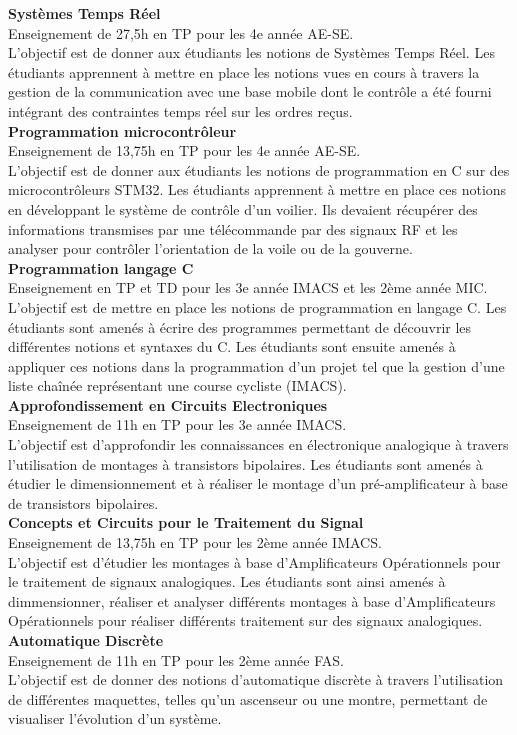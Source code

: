 \documentclass[11pt,a4paper,sans]{moderncv}         %
\begin{document}
{
  \textbf{Syst\`emes Temps R\'eel}\\
  Enseignement de 27,5h en TP pour les 4e ann\'ee AE-SE.\\
  L'objectif est de donner aux \'etudiants les notions de Syst\`emes Temps R\'eel.
  Les \'etudiants apprennent \`a mettre en place les notions vues en cours \`a travers la gestion de la communication avec une base mobile dont le contr\^ole a \'et\'e fourni int\'egrant des contraintes temps r\'eel sur les ordres re\c cus.\\
  \textbf{Programmation microcontr\^oleur}\\
  Enseignement de 13,75h en TP pour les 4e ann\'ee AE-SE.\\
  L'objectif est de donner aux \'etudiants les notions de programmation en C sur des microcontr\^oleurs STM32.
  Les \'etudiants apprennent \`a mettre en place ces notions en d\'eveloppant le syst\`eme de contr\^ole d'un voilier.
  Ils devaient r\'ecup\'erer des informations transmises par une t\'el\'ecommande par des signaux RF et les analyser pour contr\^oler l'orientation de la voile ou de la gouverne.\\
  \textbf{Programmation langage C}\\
  Enseignement en TP et TD pour les 3e ann\'ee IMACS et les 2\`eme ann\'ee MIC.\\
  L'objectif est de mettre en place les notions de programmation en langage C.
  Les \'etudiants sont amen\'es \`a \'ecrire des programmes permettant de d\'ecouvrir les diff\'erentes notions et syntaxes du C.
  Les \'etudiants sont ensuite amen\'es \`a appliquer ces notions dans la programmation d'un projet tel que la gestion d'une liste cha\^in\'ee repr\'esentant une course cycliste (IMACS).\\
  \textbf{Approfondissement en Circuits Electroniques}\\
  Enseignement de 11h en TP pour les 3e ann\'ee IMACS.\\
  L'objectif est d'approfondir les connaissances en \'electronique analogique \`a travers l'utilisation de montages \`a transistors bipolaires.
  Les \'etudiants sont amen\'es \`a \'etudier le dimensionnement et \`a r\'ealiser le montage d'un pr\'e-amplificateur \`a base de transistors bipolaires.\\
  \textbf{Concepts et Circuits pour le Traitement du Signal}\\
  Enseignement de 13,75h en TP pour les 2\`eme ann\'ee IMACS.\\
  L'objectif est d'\'etudier les montages \`a base d'Amplificateurs Op\'erationnels pour le traitement de signaux analogiques.
  Les \'etudiants sont ainsi amen\'es \`a dimmensionner, r\'ealiser et analyser diff\'erents montages \`a base d'Amplificateurs Op\'erationnels pour r\'ealiser diff\'erents traitement sur des signaux analogiques.\\
  \textbf{Automatique Discr\`ete}\\
  Enseignement de 11h en TP pour les 2\`eme ann\'ee FAS.\\
  L'objectif est de donner des notions d'automatique discr\`ete \`a travers l'utilisation de diff\'erentes maquettes, telles qu'un ascenseur ou une montre, permettant de visualiser l'\'evolution d'un syst\`eme.\\
}
\end{document}
